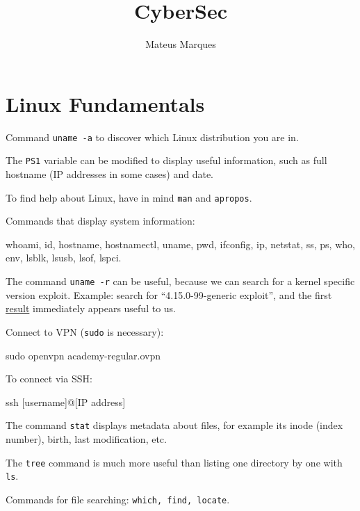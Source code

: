 \documentclass[a4paper,10pt]{article}
\title{\Huge{\textbf{CyberSec}}}
\author{Mateus Marques}
\begin{document}
\maketitle

\section{Linux Fundamentals}

Command \texttt{uname -a} to discover which Linux distribution you are in.

\n

The \texttt{PS1} variable can be modified to display useful information, such as full hostname (IP addresses in some cases) and date.

\n

To find help about Linux, have in mind \texttt{man} and \texttt{apropos}.

\n

Commands that display system information:
\begin{bash}
whoami, id, hostname, hostnamectl, uname, pwd, ifconfig, ip, netstat,
ss, ps, who, env, lsblk, lsusb, lsof, lspci.
\end{bash}

The command \texttt{uname -r} can be useful, because we can search for a kernel specific version exploit. Example: search for ``4.15.0-99-generic exploit'', and the first \href{https://www.exploit-db.com/exploits/47163}{result} immediately appears useful to us.

\n

Connect to VPN (\texttt{sudo} is necessary):
\begin{bash}
sudo openvpn academy-regular.ovpn
\end{bash}

To connect via SSH:
\begin{bash}
ssh [username]@[IP address]
\end{bash}

The command \texttt{stat} displays metadata about files, for example its inode (index number), birth, last modification, etc.

\n

The \texttt{tree} command is much more useful than listing one directory by one with \texttt{ls}.

\n

Commands for file searching: \texttt{which, find, locate}.
\end{document}
